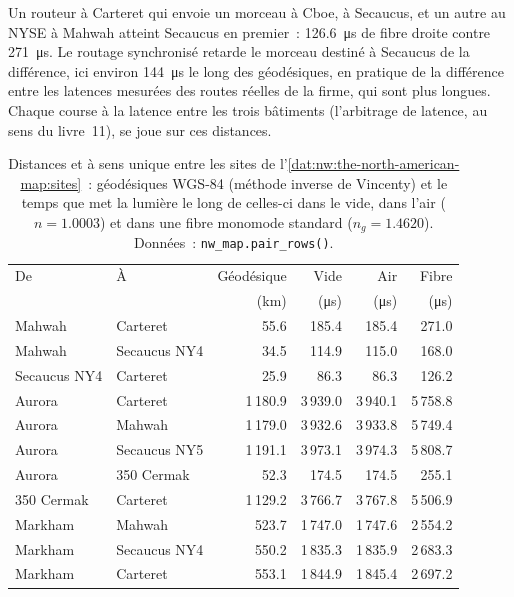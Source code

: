 Un routeur à Carteret qui envoie un morceau à Cboe, à Secaucus, et un
autre au NYSE à Mahwah atteint Secaucus en premier~: \qty{126.6}{\micro\second} de fibre droite contre \qty{271}{\micro\second}. Le routage synchronisé
retarde le morceau destiné à Secaucus de la différence, ici environ \qty{144}{\micro\second} le long des géodésiques, en pratique de la différence entre les latences mesurées
des routes réelles de la firme, qui sont plus longues. Chaque course à la latence entre les trois bâtiments (l'arbitrage de latence, au sens du
livre~11), se joue sur ces distances.

\begin{table}[ht]
\centering\small
\begin{tabular}{llrrrr}
\toprule
De & À & Géodésique & Vide & Air & Fibre \\
 & & (km) & (\si{\micro\second}) & (\si{\micro\second}) & (\si{\micro\second}) \\
\midrule
Mahwah & Carteret & 55.6 & 185.4 & 185.4 & 271.0 \\
Mahwah & Secaucus NY4 & 34.5 & 114.9 & 115.0 & 168.0 \\
Secaucus NY4 & Carteret & 25.9 & 86.3 & 86.3 & 126.2 \\
Aurora & Carteret & 1\,180.9 & 3\,939.0 & 3\,940.1 & 5\,758.8 \\
Aurora & Mahwah & 1\,179.0 & 3\,932.6 & 3\,933.8 & 5\,749.4 \\
Aurora & Secaucus NY5 & 1\,191.1 & 3\,973.1 & 3\,974.3 & 5\,808.7 \\
Aurora & 350 Cermak & 52.3 & 174.5 & 174.5 & 255.1 \\
350 Cermak & Carteret & 1\,129.2 & 3\,766.7 & 3\,767.8 & 5\,506.9 \\
Markham & Mahwah & 523.7 & 1\,747.0 & 1\,747.6 & 2\,554.2 \\
Markham & Secaucus NY4 & 550.2 & 1\,835.3 & 1\,835.9 & 2\,683.3 \\
Markham & Carteret & 553.1 & 1\,844.9 & 1\,845.4 & 2\,697.2 \\
\bottomrule
\end{tabular}
\caption{Distances et  à sens unique entre les sites de l'\cref{dat:nw:the-north-american-map:sites}~: géodésiques WGS-84 (méthode
inverse de Vincenty) et le temps que met la lumière le long de celles-ci dans le vide, dans l'air ($n = 1.0003$) et dans une fibre monomode standard ($n_g = 1.4620$).
Données~: \texttt{nw\_map.pair\_rows()}.}\label{tab:nw:the-north-american-map:pairs}
\end{table}

